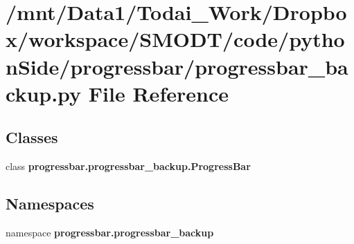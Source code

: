 \section{/mnt/\-Data1/\-Todai\-\_\-\-Work/\-Dropbox/workspace/\-S\-M\-O\-D\-T/code/python\-Side/progressbar/progressbar\-\_\-backup.py File Reference}
\label{progressbar__backup_8py}
\subsection*{Classes}
\begin{DoxyCompactItemize}
\item 
class {\bf progressbar.\-progressbar\-\_\-backup.\-Progress\-Bar}
\end{DoxyCompactItemize}
\subsection*{Namespaces}
\begin{DoxyCompactItemize}
\item 
namespace {\bf progressbar.\-progressbar\-\_\-backup}
\end{DoxyCompactItemize}
